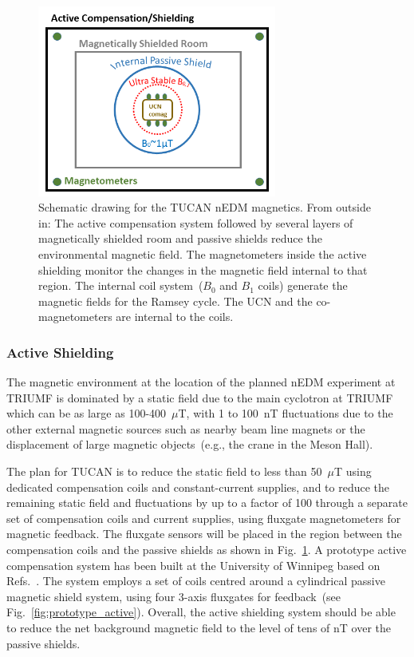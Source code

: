 \begin{figure}[h!]
  \centering
  \includegraphics[width=0.7\textwidth]{magneticscheme.png}
  \caption[Schematic of TUCAN's nEDM magnetics components]{Schematic
    drawing for the TUCAN nEDM magnetics. From outside in: The active
    compensation system followed by several layers of magnetically
    shielded room and passive shields reduce the environmental
    magnetic field. The magnetometers inside the active shielding
    monitor the changes in the magnetic field internal to that
    region. The internal coil system~($B_0$ and $B_1$ coils) generate
    the magnetic fields for the Ramsey cycle. The UCN and the
    co-magnetometers are internal to the coils.  }
  \label{fig:magneticscheme}
\end{figure}



\subsubsection{Active Shielding}

The magnetic environment at the location of the planned nEDM
experiment at TRIUMF is dominated by a static field due to the main
cyclotron at TRIUMF which can be as large as 100-400~$\mu$T, with 1 to
100~nT fluctuations due to the other external magnetic sources such as
nearby beam line magnets or the displacement of large magnetic
objects~(e.g., the crane in the Meson Hall).

The plan for TUCAN is to reduce the static field to less than
50~$\mu$T using dedicated compensation coils and constant-current
supplies,
and to reduce the remaining static field and fluctuations by up to a
factor of 100 through a separate set of compensation coils and current
supplies, using fluxgate magnetometers for magnetic feedback. The
fluxgate sensors will be placed in the region between the compensation
coils and the passive shields as shown in
Fig.~\ref{fig:magneticscheme}.  A prototype active compensation system
has been built at the University of Winnipeg based on
Refs.~\cite{beatrice,afach2014dynamic}. The system employs a set of
coils centred around a cylindrical passive magnetic shield system,
using four 3-axis fluxgates for feedback~(see
Fig.~\ref{fig:prototype_active}). Overall, the active shielding system
should be able to reduce the net background magnetic field to the
level of tens of nT over the passive shields.


